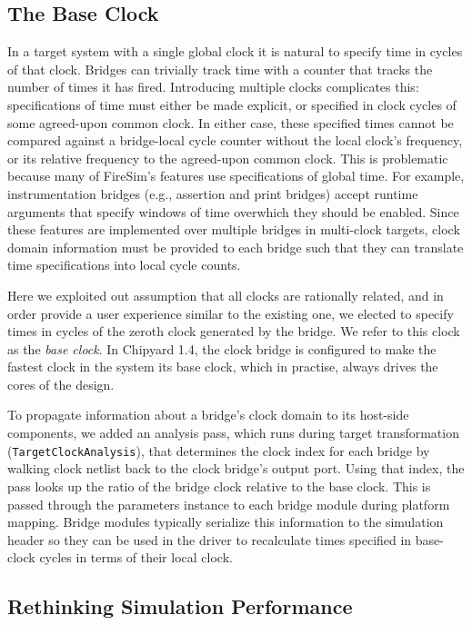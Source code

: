 \subsection{The Base Clock}

In a target system with a single global clock it is natural to specify time
in cycles of that clock. Bridges can trivially track
time with a counter that tracks the number of times it has fired. Introducing
multiple clocks complicates this: specifications of time must either be made
explicit, or specified in clock cycles of some agreed-upon common clock. In
either case, these specified times cannot be compared against a bridge-local
cycle counter without the local clock's frequency, or its relative frequency to
the agreed-upon common clock. This is problematic because many of FireSim's
features use specifications of global time. For example,
instrumentation bridges (e.g., assertion and print bridges) accept
runtime arguments that specify windows of time overwhich they should be
enabled. Since these features are implemented over multiple bridges in
multi-clock targets, clock domain information must be provided to each bridge
such that they can translate time specifications into local cycle counts.

Here we exploited out assumption that all clocks are rationally related, and in
order provide a user experience similar to the existing one, we elected to
specify times in cycles of the zeroth clock generated by the bridge. We refer
to this clock as the \emph{base clock}. In Chipyard 1.4, the clock bridge is
configured to make the fastest clock in the system its base clock, which in
practise, always drives the cores of the design.

To propagate information about a bridge's clock domain to its host-side
components, we added an analysis pass, which runs during target transformation
(\texttt{TargetClockAnalysis}), that determines the clock index for each bridge
by walking clock netlist back to the clock bridge's output port. Using that
index, the pass looks up the ratio of the bridge clock relative to the base
clock. This is passed through the parameters instance to each bridge module
during platform mapping. Bridge modules typically serialize this information to the
simulation header so they can be used in the driver to recalculate times
specified in base-clock cycles in terms of their local clock.

\subsection{Rethinking Simulation Performance}

